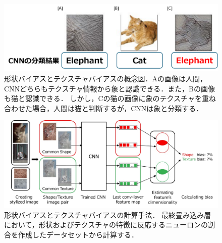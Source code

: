 \begin{figure}[h]
    \centering
    \includegraphics[width=\linewidth]{fig/shapetexturebias.pdf}
    \caption[形状バイアスとテクスチャバイアスの概念図]{形状バイアスとテクスチャバイアスの概念図．Aの画像は人間，CNNどちらもテクスチャ情報から象と認識できる．また，Bの画像も猫と認識できる．
    しかし，Cの猫の画像に象のテクスチャを重ね合わせた場合，人間は猫と判断するが，CNNは象と分類する．}
\end{figure}

\begin{figure}[h]
    \centering
    \includegraphics[width=\linewidth]{fig/IslamSTB.pdf}
    \caption[形状バイアスとテクスチャバイアスの計算手法]{形状バイアスとテクスチャバイアスの計算手法．
    最終畳み込み層において，形状およびテクスチャの特徴に反応するニューロンの割合を作成したデータセットから計算する．}
    \label{fig:IslamSTB}
\end{figure}

